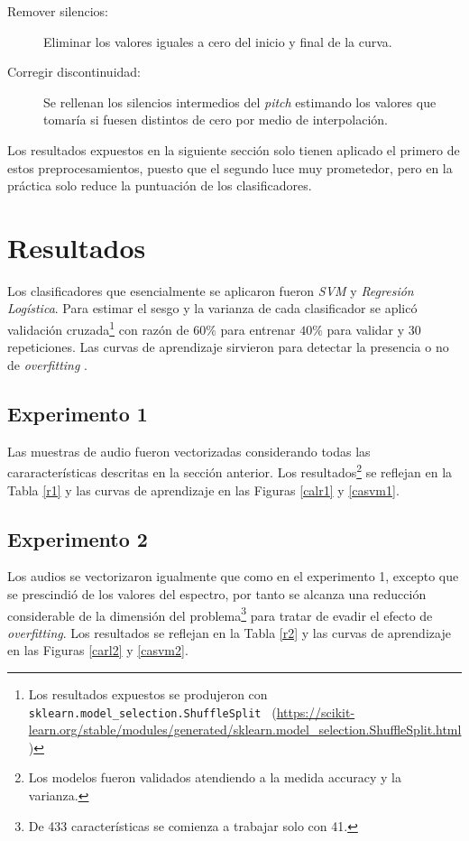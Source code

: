 \begin{description}
\item[Remover silencios:] Eliminar los valores iguales a cero del inicio y final de la curva.
\item[Corregir discontinuidad:] Se rellenan los silencios intermedios del \emph{pitch} estimando los valores que tomar\'ia si fuesen distintos de cero por medio de interpolaci\'on. 
\end{description}

Los resultados expuestos en la siguiente secci\'on solo tienen aplicado el primero de estos preprocesamientos, puesto que el segundo luce muy prometedor, pero en la pr\'actica solo reduce la puntuaci\'on de los clasificadores.

\section{Resultados}
Los clasificadores que esencialmente se aplicaron fueron \emph{SVM} y \emph{Regresi\'on Log\'istica}. Para estimar el sesgo y la varianza de cada clasificador se aplic\'o validaci\'on cruzada\footnote{Los resultados expuestos se produjeron con \texttt{sklearn.model\_selection.ShuffleSplit}~ (\url{https://scikit-learn.org/stable/modules/generated/sklearn.model_selection.ShuffleSplit.html})} con raz\'on de $60\%$ para entrenar $40\%$ para validar y 30 repeticiones. Las curvas de aprendizaje\cite[secci\'on 7.5.4]{murphy2012machine} sirvieron para detectar la presencia o no de \emph{overfitting} \cite[p.22]{murphy2012machine}.

\subsection{Experimento 1}
Las muestras de audio fueron vectorizadas 
considerando todas las cararacter\'isticas 
descritas 
en la secci\'on anterior. Los 
resultados\footnote{Los modelos fueron validados
 atendiendo a la 
medida accuracy y la varianza\cite{murphy2012machine}.} 
se reflejan en la Tabla \ref{r1} y 
las curvas de aprendizaje en las Figuras \ref{calr1} y \ref{casvm1}.



\subsection{Experimento 2}
Los audios se vectorizaron igualmente que como en el experimento 1, excepto que se prescindi\'o de los valores del espectro, por tanto se alcanza una reducci\'on considerable de la dimensi\'on del problema\footnote{De 433 caracter\'isticas se comienza a trabajar solo con 41.} para tratar de evadir el efecto de \emph{overfitting}. Los resultados se reflejan en la Tabla \ref{r2} y las curvas de aprendizaje en las Figuras \ref{carl2} y \ref{casvm2}.


